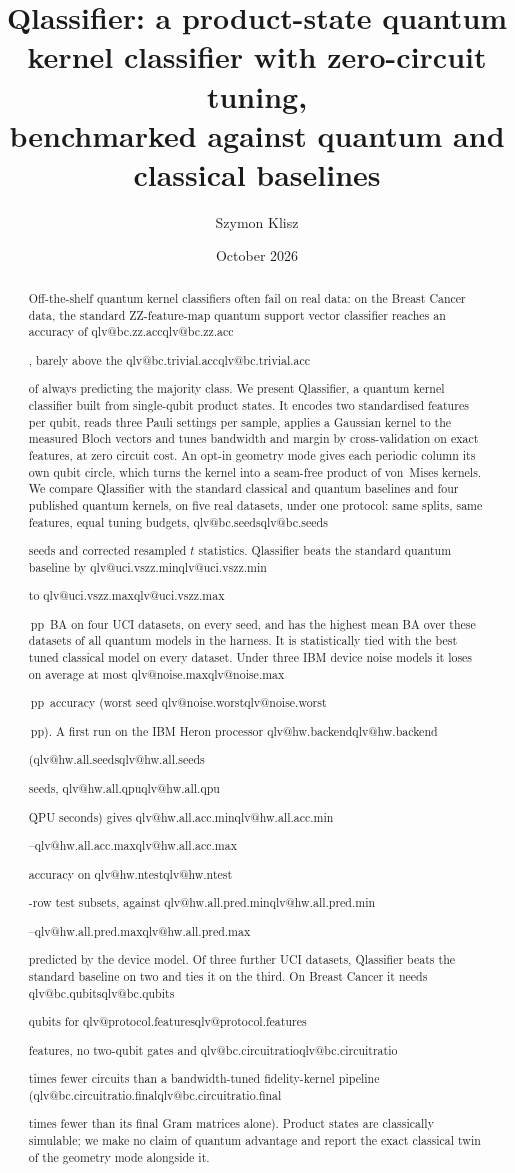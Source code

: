 \documentclass[aps,pra,reprint,superscriptaddress,nofootinbib,longbibliography]{revtex4-2}
\makeatletter
\newcommand{\val}[1]{\ifcsname qlv@#1\endcsname\csname qlv@#1\endcsname\else
  \PackageError{qlassifier}{No value '#1'}{Run python scripts/paper_tables.py}\fi}
\newcommand{\pp}{\,pp}
\makeatother
\begin{document}
\title{Qlassifier: a product-state quantum kernel classifier with zero-circuit tuning,\\
benchmarked against quantum and classical baselines}

\author{Szymon Klisz}
\noaffiliation

\date{October 2026}

\begin{abstract}
Off-the-shelf quantum kernel classifiers often fail on real data: on the Breast Cancer data, the standard
ZZ-feature-map quantum support vector classifier reaches an accuracy of \val{bc.zz.acc}, barely above the
\val{bc.trivial.acc} of always predicting the majority class. We present Qlassifier, a quantum kernel
classifier built from single-qubit product states. It encodes two standardised features per qubit, reads three Pauli
settings per sample, applies a Gaussian kernel to the measured Bloch vectors and tunes bandwidth and margin by
cross-validation on exact features, at zero circuit cost. An opt-in geometry mode gives each periodic column its own
qubit circle, which turns the kernel into a seam-free product of von~Mises kernels. We compare Qlassifier with the
standard classical and quantum baselines and four published quantum kernels, on five real datasets, under one protocol: same splits,
same features, equal tuning budgets, \val{bc.seeds} seeds and corrected resampled $t$ statistics. Qlassifier beats the
standard quantum baseline by \val{uci.vszz.min} to \val{uci.vszz.max}\pp\ BA on four UCI datasets, on every seed, and
has the highest mean BA over these datasets of all quantum models in the harness. It is statistically tied with the
best tuned classical model on every dataset. Under three IBM device noise models it loses on average at most
\val{noise.max}\pp\ accuracy (worst seed \val{noise.worst}\pp). A first run on the IBM Heron processor
\val{hw.backend} (\val{hw.all.seeds} seeds, \val{hw.all.qpu} QPU seconds) gives \val{hw.all.acc.min}--\val{hw.all.acc.max} accuracy on
\val{hw.ntest}-row test subsets, against \val{hw.all.pred.min}--\val{hw.all.pred.max} predicted by the device model. Of three further
UCI datasets, Qlassifier beats the standard baseline on two and ties it on the third. On Breast Cancer it needs \val{bc.qubits} qubits for
\val{protocol.features} features, no two-qubit gates and \val{bc.circuitratio} times fewer circuits than a
bandwidth-tuned fidelity-kernel pipeline (\val{bc.circuitratio.final} times fewer than its final Gram matrices alone).
Product states are classically simulable; we make no claim of quantum advantage and report the exact classical twin
of the geometry mode alongside it.
\end{abstract}
\end{document}
